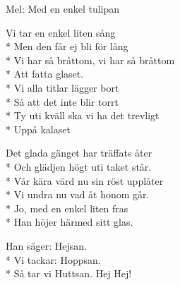 \begin{SongText}
    \begin{SongInfo}
        Mel: Med en enkel tulipan
    \end{SongInfo}
    \begin{SongVerse}
        Vi tar en enkel liten sång\\*%
        Men den får ej bli för lång\\*%
        Vi har så bråttom, vi har så bråttom\\*%
        Att fatta glaset.\\*%
        Vi alla titlar lägger bort\\*%
        Så att det inte blir torrt\\*%
        Ty uti kväll ska vi ha det trevligt\\*%
        Uppå kalaset
    \end{SongVerse}
    \begin{SongVerse}
        Det glada gänget har träffats åter\\*%
        Och glädjen högt uti taket står.\\*%
        Vår kära värd nu sin röst upplåter\\*%
        Vi undra nu vad åt honom går.\\*%
        Jo, med en enkel liten fras\\*%
        Han höjer härmed sitt glas.
    \end{SongVerse}
    \begin{SongVerse}
        Han säger: Hejsan.\\*%
        Vi tackar: Hoppsan.\\*%
        Så tar vi Huttsan. Hej Hej!
    \end{SongVerse}
\end{SongText}
